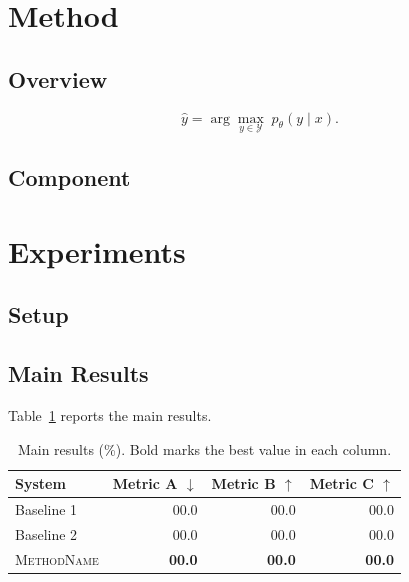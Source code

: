 \documentclass[11pt,letterpaper]{softmax_preprint}
\newcommand{\sysname}{\textsc{MethodName}}
\begin{document}
\section{Method}
\label{sec:method}

\subsection{Overview}
\lipsum[6][1-4]
\begin{equation}
  \hat{y} = \arg\max_{y \in \mathcal{Y}} \; p_\theta(y \mid x).
  \label{eq:example}
\end{equation}

\subsection{Component}
\lipsum[7][1-4]

\section{Experiments}
\label{sec:experiments}

\subsection{Setup}
\lipsum[8][1-3]

\subsection{Main Results}
Table~\ref{tab:example} reports the main results.

\begin{table}[!htbp]
\centering
\small
\begin{tabular}{lrrr}
\toprule
System & Metric A $\downarrow$ & Metric B $\uparrow$ & Metric C $\uparrow$ \\
\midrule
Baseline 1 & 00.0 & 00.0 & 00.0 \\
Baseline 2 & 00.0 & 00.0 & 00.0 \\
\midrule
\sysname{} & \textbf{00.0} & \textbf{00.0} & \textbf{00.0} \\
\bottomrule
\end{tabular}
\caption{Main results (\%). Bold marks the best value in each column.}
\label{tab:example}
\end{table}

\lipsum[9][1-4]

\lipsum[10][1-3]
\end{document}
